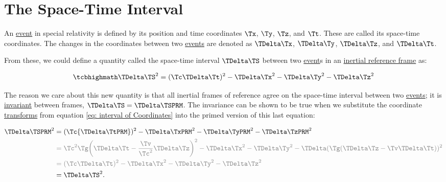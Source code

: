 \section{The Space-Time Interval} \label{sect: Space-Time Interval}

An \hyperlink{def-event}{event} in special relativity is defined by its position and time coordinates $\Tx $, $\Ty $, $\Tz $, and $\Tt $.
These are called its space-time coordinates.
The changes in the coordinates between two \hyperlink{def-event}{events} are denoted as ${\TDelta  \Tx }$, ${\TDelta  \Ty }$, ${\TDelta  \Tz }$, and ${\TDelta  \Tt }$.

From these, we could define a quantity called the space-time interval $\TDelta  \TS $ between two \hyperlink{def-event}{event}s in an \hyperlink{def-Inertial-reference-frame}{inertial reference frame} as:

\begin{equation}
	\label{eq: space-time interval}
	\mhl{
	\TDelta  \TS ^2 = (\Tc \TDelta  \Tt )^2-{\TDelta  \Tx }^2-{\TDelta  \Ty }^2-{\TDelta  \Tz }^2
	}
\end{equation}

The reason we care about this new quantity is that all inertial frames of reference agree on the space-time interval between two \hyperlink{def-event}{events}; it is \hyperlink{def-lorentz-invariant}{invariant} between frames, $\TDelta  \TS  = \TDelta  \TSPRM $.
The invariance can be shown to be true when we substitute the coordinate \hyperlink{def-transform}{transforms} from equation \eqref{eq: interval of Coordinates} into the primed version of this last equation:

\begin{equation}
	\begin{aligned}
		\TDelta  \TSPRM ^2 & = (\Tc {\TDelta  \TtPRM  })^2-\TDelta  \TxPRM ^2-{\TDelta  \TyPRM  }^2-{\TDelta  \TzPRM  }^2                                                                                          \\
		              & \color{gray} = \Tc ^2{\Tg } \bigg( \TDelta  \Tt -\frac{\Tv }{ \Tc ^2} {\TDelta  \Tz } \bigg)^2-{\TDelta  \Tx }^2-{\TDelta  \Ty }^2-\TDelta  ({\Tg } ( {\TDelta  \Tz }- \Tv  \TDelta  \Tt ) )^2 \\
		              & \color{gray} = (\Tc \TDelta  \Tt )^2-{\TDelta  \Tx }^2-{\TDelta  \Ty }^2-{\TDelta  \Tz }^2                                                                                         \\
		              & = \TDelta  \TS ^2.
	\end{aligned}
\end{equation}

